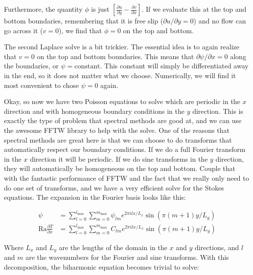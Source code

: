 \documentclass[a4paper,10pt]{article}
\begin{document}
Furthermore, the quantity $\phi$ is just $\left[ \frac{\partial u}{\partial y} - \frac{\partial v}{\partial x} \right]$. 
If we evaluate this at the top and bottom boundaries, remembering that it is free slip ($\partial u /\partial y = 0$)  and no flow can go across it ($v=0$), we find that $\phi=0$ on the top and bottom.

The second Laplace solve is a bit trickier.  The essential idea is to again realize that $v=0$ on the top and bottom boundaries.  
This means that $\partial \psi /\partial x = 0$ along the boundaries, or $\psi = \mathrm{constant}$.
This constant will simply be differentiated away in the end, so it does not matter what we choose.
Numerically, we will find it most convenient to chose $\psi=0$ again. 

Okay, so now we have two Poisson equations to solve which are periodic in the $x$ direction and with homogeneous boundary conditions in the $y$ direction.
This is exactly the type of problem that spectral methods are good at, and we can use the awesome FFTW library to help with the solve. 
One of the reasons that spectral methods are great here is that we can choose to do transforms that automatically respect our boundary conditions.
If we do a full Fourier transform in the $x$ direction it will be periodic.
If we do sine transforms in the $y$ direction, they will automatically be homogeneous on the top and bottom.
Couple that with the fantastic performance of FFTW and the fact that we really only need to do one set of transforms, and we have a very efficient solve for the Stokes equations.
The expansion in the Fourier basis looks like this:

\begin{equation}
\begin{aligned}
\psi &= \displaystyle \sum_{l=0}^{l_{\mathrm{max}}} \sum_{m=0}^{m_{\mathrm{max}}} \psi_{lm}  e^{2 \pi i l x / L_x} \sin( \pi (m+1) y/ L_y)  \\
\mathrm{Ra} \frac{\partial T}{\partial x} &= \displaystyle \sum_{l=0}^{l_{\mathrm{max}}} \sum_{m=0}^{m_{\mathrm{max}}} C_{lm}  e^{2 \pi i l x /L_x} \sin( \pi (m+1) y/ L_y) 
\end{aligned}
\end{equation}

Where $L_x$ and $L_y$ are the lengths of the domain in the $x$ and $y$ directions, and $l$ and $m$ are the wavenumbers for the Fourier and sine transforms.
With this decomposition, the biharmonic equation becomes trivial to solve:
\end{document}
